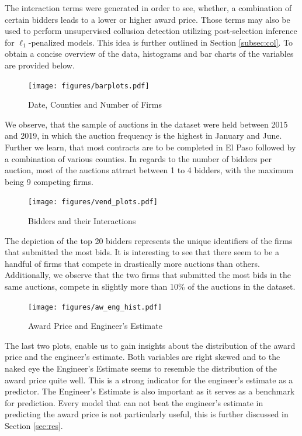 \documentclass[a4paper,12pt, headsepline]{scrartcl}
\numberwithin{equation}{section}
\begin{document}
The interaction terms were generated in order to see, whether, a combination of certain bidders leads to a lower or higher award price. Those terms may also be used to perform unsupervised collusion detection utilizing post-selection inference for $\ell_1$-penalized models. This idea is further outlined in Section \ref{subsec:col}. To obtain a concise overview of the data,  histograms and bar charts of the variables are provided below.

\begin{figure}[H]
	\texttt{[image: figures/barplots.pdf]}
	\caption{Date, Counties and Number of Firms}\label{fig:barplots}
\end{figure}

We observe, that the sample of auctions in the dataset were held between 2015 and 2019, in which the auction frequency is the highest in January and June. Further we learn, that most contracts are to be completed in El Paso followed by a combination of various counties. In regards to the number of bidders per auction, most of the auctions attract between 1 to 4 bidders, with the maximum being 9 competing firms.

\begin{figure}[H]
	\texttt{[image: figures/vend\_plots.pdf]}
	\caption{Bidders and their Interactions}\label{fig:vendplots}
\end{figure}

The depiction of the top 20 bidders represents the unique identifiers of the firms that submitted the most bids. It is interesting to see that there seem to be a handful of firms that compete in drastically more auctions than others. Additionally, we observe that the two firms that submitted the most bids in the same auctions, compete in slightly more than 10\% of the auctions in the dataset.

\begin{figure}[H]
	\texttt{[image: figures/aw\_eng\_hist.pdf]}
	\caption{Award Price and Engineer's Estimate}\label{fig:aweng}
\end{figure}

The last two plots, enable us to gain insights about the distribution of the award price and the engineer's estimate. Both variables are right skewed and to the naked eye the Engineer's Estimate seems to resemble the distribution of the award price quite well. This is a strong indicator for the engineer's estimate as a predictor. The Engineer's Estimate is also important as it serves as a benchmark for prediction. Every model that can not beat the engineer's estimate in predicting the award price is not particularly useful, this is further discussed in Section \ref{sec:res}.\\
\newpage
\end{document}
